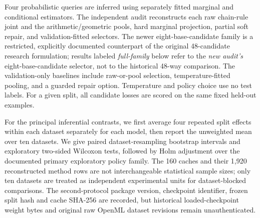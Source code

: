 \documentclass[a4paper,fleqn]{cas-sc}
\begin{document}
Four probabilistic queries are inferred using separately fitted marginal and conditional estimators. The independent audit reconstructs each raw chain-rule joint and the arithmetic/geometric pools, hard marginal projection, partial soft repair, and validation-fitted selectors. The newer eight-base-candidate family is a restricted, explicitly documented counterpart of the original 48-candidate research formulation; results labeled \emph{full-family} below refer to the \emph{new audit's} eight-base-candidate selector, not to the historical 48-way comparison. The validation-only baselines include raw-or-pool selection, temperature-fitted pooling, and a guarded repair option. Temperature and policy choice use no test labels. For a given split, all candidate losses are scored on the same fixed held-out examples.

For the principal inferential contrasts, we first average four repeated split effects within each dataset separately for each model, then report the unweighted mean over ten datasets. We give paired dataset-resampling bootstrap intervals and exploratory two-sided Wilcoxon tests, followed by Holm adjustment over the documented primary exploratory policy family. The 160 caches and their 1,920 reconstructed method rows are not interchangeable statistical sample sizes; only ten datasets are treated as independent experimental units for dataset-blocked comparisons. The second-protocol package version, checkpoint identifier, frozen split hash and cache SHA-256 are recorded, but historical loaded-checkpoint weight bytes and original raw OpenML dataset revisions remain unauthenticated.
\end{document}
